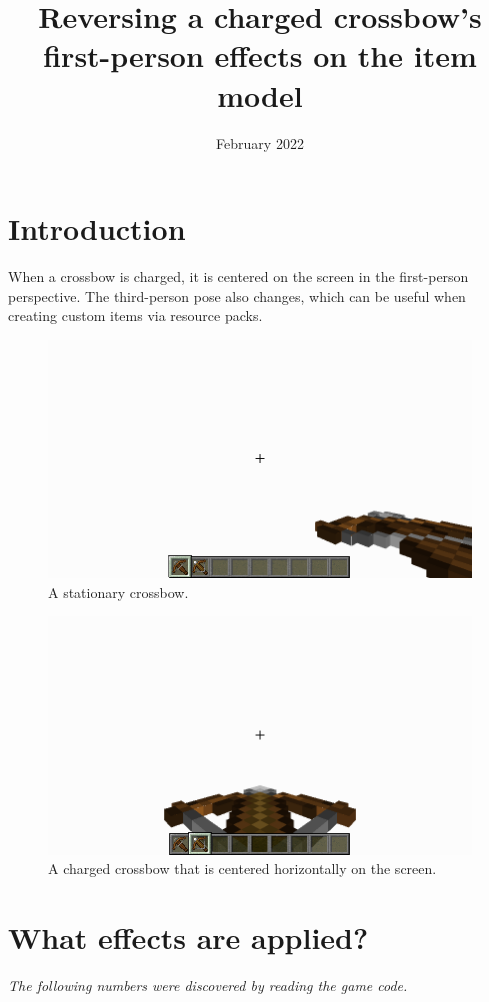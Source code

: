 \documentclass{article}
\title{Reversing a charged crossbow's first-person effects on the item model}
\date{February 2022}
\begin{document}
\maketitle

\newpage

\section{Introduction}
When a crossbow is charged, it is centered on the screen in the first-person perspective. The third-person pose also changes, which can be useful when creating custom items via resource packs.

\begin{figure}[h]
	\centering
	\includegraphics[width=0.75\linewidth]{images/crossbow-stationary}
	\caption{A stationary crossbow.}
	\label{fig:crossbow-stationary}
\end{figure}

\begin{figure}[h]
	\centering
	\includegraphics[width=0.75\linewidth]{images/crossbow-charged}
	\caption{A charged crossbow that is centered horizontally on the screen.}
	\label{fig:crossbow-charged}
\end{figure}

\section{What effects are applied?}
\begin{flushleft}\textit{The following numbers were discovered by reading the game code.}\end{flushleft}
\end{document}
